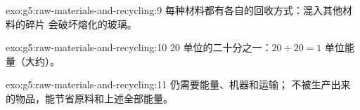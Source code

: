 \begin{solution}{exo:g5:raw-materials-and-recycling:9}
每种材料都有各自的回收方式：混入其他材料的碎片
会破坏熔化的玻璃。
\end{solution}

\begin{solution}{exo:g5:raw-materials-and-recycling:10}
20 单位的二十分之一：$20 \div 20 = 1$ 单位能量（大约）。
\end{solution}

\begin{solution}{exo:g5:raw-materials-and-recycling:11}
仍需要能量、机器和运输；
不被生产出来的物品，能节省原料和上述全部能量。
\end{solution}
